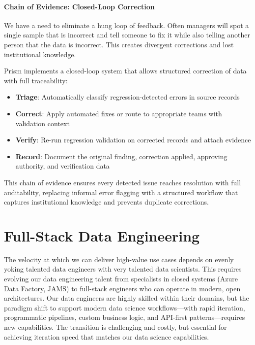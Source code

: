 \documentclass[12pt, a4paper]{article}
\begin{document}
\paragraph{Chain of Evidence: Closed-Loop Correction}
We have a need to eliminate a hung loop of feedback. Often managers will spot a single sample that is incorrect and tell someone to fix it while also telling another person that the data is incorrect. This creates divergent corrections and lost institutional knowledge.

Prism implements a closed-loop system that allows structured correction of data with full traceability:

\begin{itemize}[leftmargin=*, nosep]
    \item \textbf{Triage}: Automatically classify regression-detected errors in source records
    \item \textbf{Correct}: Apply automated fixes or route to appropriate teams with validation context
    \item \textbf{Verify}: Re-run regression validation on corrected records and attach evidence
    \item \textbf{Record}: Document the original finding, correction applied, approving authority, and verification data
\end{itemize}

This chain of evidence ensures every detected issue reaches resolution with full auditability, replacing informal error flagging with a structured workflow that captures institutional knowledge and prevents duplicate corrections.

\section{Full-Stack Data Engineering}

The velocity at which we can deliver high-value use cases depends on evenly yoking talented data engineers with very talented data scientists. This requires evolving our data engineering talent from specialists in closed systems (Azure Data Factory, JAMS) to full-stack engineers who can operate in modern, open architectures. Our data engineers are highly skilled within their domains, but the paradigm shift to support modern data science workflows—with rapid iteration, programmatic pipelines, custom business logic, and API-first patterns—requires new capabilities. The transition is challenging and costly, but essential for achieving iteration speed that matches our data science capabilities.
\end{document}
